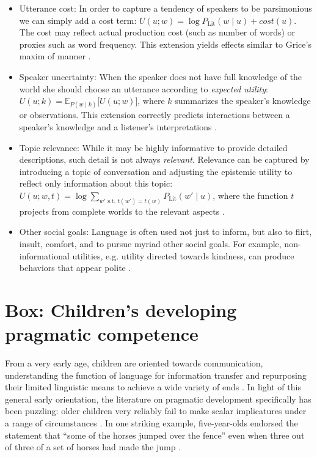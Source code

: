 \documentclass[]{elsarticle}
\begin{document}
\begin{itemize}
\item Utterance cost: In order to capture a tendency of speakers to be
  parsimonious we can simply add a cost term: $U(u; w) =
  \log P_{\text{Lit}}(w\mid u) + cost(u)$. The cost may
  reflect actual production cost (such as number of words) or proxies
  such as word frequency. This extension yields effects similar to
  Grice's maxim of manner \citep{bergen2016}.

\item Speaker uncertainty: When the speaker does not have full knowledge of
  the world she should choose an utterance according to \emph{expected
  utility}: $U(u;k) = {\mathbb E}_{P(w\mid k)}{[}U(u;w){]}$, where $k$
  summarizes the speaker's knowledge or observations. This extension
  correctly predicts interactions between a speaker's knowledge and a
  listener's interpretations \citep{goodman2013}.

\item Topic relevance: While it may be highly informative to provide detailed descriptions, such detail is not always \emph{relevant}. Relevance can be captured by introducing a topic of conversation \citep[sometimes known as a \emph{Question Under Discussion,}][]{roberts1996} and adjusting the epistemic utility to reflect only information about this topic: $U(u;w,t)=\log \sum_{w' \text{ s.t. } t(w')=t(w)} P_{\text{Lit}}(w'\mid u)$, where the function $t$ projects from complete worlds to the relevant aspects \citep{kao2014}.

\item Other social goals: Language is often used not just to inform, but
  also to flirt, insult, comfort, and to pursue myriad other social
  goals. For example, non-informational utilities, e.g. utility directed towards
  kindness, can produce behaviors that appear polite \citep{yoon2016}.

\end{itemize}

\section{Box: Children's developing pragmatic competence}\label{box-childrens-developing-pragmatic-competence.}

From a very early age, children are oriented towards communication, understanding the function of language for information
transfer and repurposing their limited linguistic means to achieve a
wide variety of ends \citep{vouloumanos2012,clark2010}. In light
of this general early orientation, the literature on pragmatic
development specifically has been puzzling: older children very reliably
fail to make scalar implicatures under a range of circumstances \citep{noveck2001}. In one striking example, five-year-olds endorsed the statement that ``some of the horses jumped over the fence'' even when three out of three of a set of horses had made the jump \citep{papafragou2003}.
\end{document}
